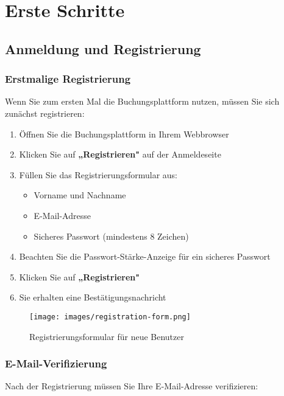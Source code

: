 \section{Erste Schritte}
\label{sec:erste-schritte}

\subsection{Anmeldung und Registrierung}

\subsubsection{Erstmalige Registrierung}

Wenn Sie zum ersten Mal die Buchungsplattform nutzen, müssen Sie sich zunächst registrieren:

\begin{enumerate}
    \item Öffnen Sie die Buchungsplattform in Ihrem Webbrowser
    \item Klicken Sie auf \textbf{„Registrieren"} auf der Anmeldeseite
    \item Füllen Sie das Registrierungsformular aus:
        \begin{itemize}
            \item Vorname und Nachname
            \item E-Mail-Adresse
            \item Sicheres Passwort (mindestens 8 Zeichen)
        \end{itemize}
    \item Beachten Sie die Passwort-Stärke-Anzeige für ein sicheres Passwort
    \item Klicken Sie auf \textbf{„Registrieren"}
    \item Sie erhalten eine Bestätigungsnachricht
\end{enumerate}

\begin{figure}[H]
    \centering
    \texttt{[image: images/registration-form.png]}
    \caption{Registrierungsformular für neue Benutzer}
    \label{fig:registration}
\end{figure}

\subsubsection{E-Mail-Verifizierung}

Nach der Registrierung müssen Sie Ihre E-Mail-Adresse verifizieren:

